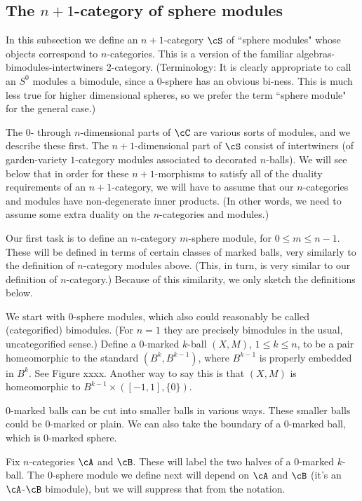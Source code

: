 \subsection{The $n{+}1$-category of sphere modules}

In this subsection we define an $n{+}1$-category $\cS$ of ``sphere modules" 
whose objects correspond to $n$-categories.
This is a version of the familiar algebras-bimodules-intertwiners 2-category.
(Terminology: It is clearly appropriate to call an $S^0$ modules a bimodule,
since a 0-sphere has an obvious bi-ness.
This is much less true for higher dimensional spheres, 
so we prefer the term ``sphere module" for the general case.)

The $0$- through $n$-dimensional parts of $\cC$ are various sorts of modules, and we describe
these first.
The $n{+}1$-dimensional part of $\cS$ consist of intertwiners
(of garden-variety $1$-category modules associated to decorated $n$-balls).
We will see below that in order for these $n{+}1$-morphisms to satisfy all of
the duality requirements of an $n{+}1$-category, we will have to assume
that our $n$-categories and modules have non-degenerate inner products.
(In other words, we need to assume some extra duality on the $n$-categories and modules.)

\medskip

Our first task is to define an $n$-category $m$-sphere module, for $0\le m \le n-1$.
These will be defined in terms of certain classes of marked balls, very similarly
to the definition of $n$-category modules above.
(This, in turn, is very similar to our definition of $n$-category.)
Because of this similarity, we only sketch the definitions below.

We start with 0-sphere modules, which also could reasonably be called (categorified) bimodules.
(For $n=1$ they are precisely bimodules in the usual, uncategorified sense.)
Define a 0-marked $k$-ball $(X, M)$, $1\le k \le n$, to be a pair homeomorphic to the standard
$(B^k, B^{k-1})$, where $B^{k-1}$ is properly embedded in $B^k$.
See Figure xxxx.
Another way to say this is that $(X, M)$ is homeomorphic to $B^{k-1}\times([-1,1], \{0\})$.

0-marked balls can be cut into smaller balls in various ways.
These smaller balls could be 0-marked or plain.
We can also take the boundary of a 0-marked ball, which is 0-marked sphere.

Fix $n$-categories $\cA$ and $\cB$.
These will label the two halves of a 0-marked $k$-ball.
The 0-sphere module we define next will depend on $\cA$ and $\cB$ 
(it's an $\cA$-$\cB$ bimodule), but we will suppress that from the notation.

